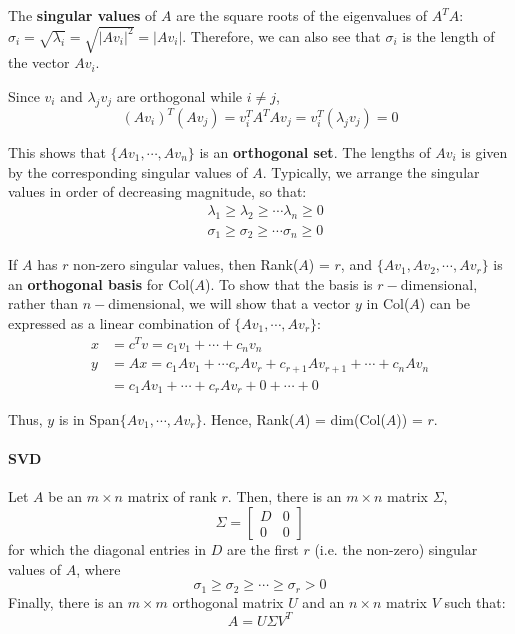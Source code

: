 \documentclass[]{article}
\newcommand{\norm}[1]{\lvert #1 \rvert}
\begin{document}
The \textbf{singular values} of $A$ are the square roots of the eigenvalues of $A^{T}A$: $\sigma_{i} = \sqrt{\lambda_{i}} = \sqrt{\norm{Av_i}^{2}} = \norm{Av_i}$. Therefore, we can also see that $\sigma_{i}$ is the length of the vector $Av_{i}$. 

Since $v_i$ and $\lambda_{j}v_j$ are orthogonal while $i \neq j$,
\begin{equation*}
(Av_i)^{T}(Av_j) = v_{i}^{T}A^{T}Av_{j} = v_{i}^{T}(\lambda_j v_{j}) = 0
\end{equation*}

This shows that $\{Av_{1}, \dotsm, Av_{n} \}$ is an \textbf{orthogonal set}. The lengths of $Av_{i}$ is given by the corresponding singular values of $A$. Typically, we arrange the singular values in order of decreasing magnitude, so that:
\begin{align*}
&\lambda_{1} \geq \lambda_{2} \geq \dotsm \lambda_{n} \geq 0 \\
&\sigma_{1} \geq \sigma_{2} \geq \dotsm \sigma_{n} \geq 0 
\end{align*}

If $A$ has $r$ non-zero singular values, then Rank($A$) = $r$, and $\{Av_{1}, Av_{2}, \dotsm, Av_{r} \}$ is an \textbf{orthogonal basis} for Col($A$). To show that the basis is $r-$dimensional, rather than $n-$dimensional, we will show that a vector $y$ in Col($A$) can be expressed as a linear combination of $\{Av_{1}, \dotsm, Av_{r} \}$:
\begin{align*}
x &= c^{T}v = c_{1}v_{1} + \dotsm + c_{n}v_{n} \\
y &= Ax = c_{1}Av_{1} + \dotsm c_{r}Av_{r} + c_{r+1}Av_{r+1} + \dotsm + c_{n}Av_{n} \\
&= c_{1}Av_{1} + \dotsm + c_{r}Av_{r} + 0 + \dotsm + 0
\end{align*}

Thus, $y$ is in Span$\{Av_{1}, \dotsm, Av_{r} \}$. Hence, Rank($A$) = dim(Col($A$)) = $r$.

\paragraph{SVD \\}
Let $A$ be an $m \times n$ matrix of rank $r$. Then, there is an $m \times n$ matrix $\Sigma$,
\begin{equation*}
\Sigma = \begin{bmatrix}
D & 0 \\ 0 & 0
\end{bmatrix}
\end{equation*}
for which the diagonal entries in $D$ are the first $r$ (i.e. the non-zero) singular values of $A$, where
\begin{equation*}
\sigma_{1} \geq \sigma_{2} \geq \dotsm \geq \sigma_{r} > 0
\end{equation*}
Finally, there is an $m \times m$ orthogonal matrix $U$ and an $n \times n$ matrix $V$ such that:
\begin{equation}
A = U \Sigma V^{T}
\end{equation}
\end{document}
